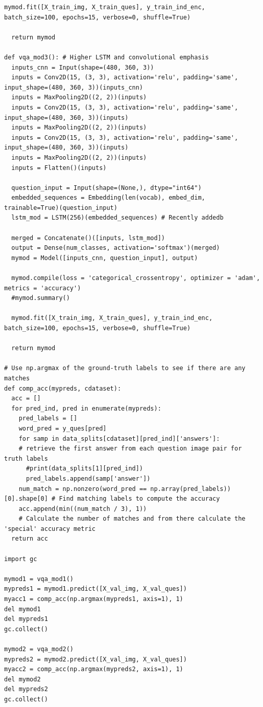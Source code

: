 \documentclass[12pt]{article}
\begin{document}
\begin{lstlisting}[breaklines=true]
  mymod.fit([X_train_img, X_train_ques], y_train_ind_enc, batch_size=100, epochs=15, verbose=0, shuffle=True)

  return mymod

def vqa_mod3(): # Higher LSTM and convolutional emphasis
  inputs_cnn = Input(shape=(480, 360, 3))
  inputs = Conv2D(15, (3, 3), activation='relu', padding='same', input_shape=(480, 360, 3))(inputs_cnn)
  inputs = MaxPooling2D((2, 2))(inputs)
  inputs = Conv2D(15, (3, 3), activation='relu', padding='same', input_shape=(480, 360, 3))(inputs)
  inputs = MaxPooling2D((2, 2))(inputs)
  inputs = Conv2D(15, (3, 3), activation='relu', padding='same', input_shape=(480, 360, 3))(inputs)
  inputs = MaxPooling2D((2, 2))(inputs)
  inputs = Flatten()(inputs)

  question_input = Input(shape=(None,), dtype="int64")
  embedded_sequences = Embedding(len(vocab), embed_dim, trainable=True)(question_input)
  lstm_mod = LSTM(256)(embedded_sequences) # Recently addedb

  merged = Concatenate()([inputs, lstm_mod])
  output = Dense(num_classes, activation='softmax')(merged)
  mymod = Model([inputs_cnn, question_input], output)

  mymod.compile(loss = 'categorical_crossentropy', optimizer = 'adam', metrics = 'accuracy')
  #mymod.summary()

  mymod.fit([X_train_img, X_train_ques], y_train_ind_enc, batch_size=100, epochs=15, verbose=0, shuffle=True)

  return mymod

# Use np.argmax of the ground-truth labels to see if there are any matches
def comp_acc(mypreds, cdataset):
  acc = []
  for pred_ind, pred in enumerate(mypreds):
    pred_labels = []
    word_pred = y_ques[pred]
    for samp in data_splits[cdataset][pred_ind]['answers']:
    # retrieve the first answer from each question image pair for truth labels
      #print(data_splits[1][pred_ind])
      pred_labels.append(samp['answer'])
    num_match = np.nonzero(word_pred == np.array(pred_labels))[0].shape[0] # Find matching labels to compute the accuracy
    acc.append(min((num_match / 3), 1))
    # Calculate the number of matches and from there calculate the 'special' accuracy metric
  return acc

import gc

mymod1 = vqa_mod1()
mypreds1 = mymod1.predict([X_val_img, X_val_ques])
myacc1 = comp_acc(np.argmax(mypreds1, axis=1), 1)
del mymod1
del mypreds1
gc.collect()

mymod2 = vqa_mod2()
mypreds2 = mymod2.predict([X_val_img, X_val_ques])
myacc2 = comp_acc(np.argmax(mypreds2, axis=1), 1)
del mymod2
del mypreds2
gc.collect()


\end{lstlisting}
\end{document}
